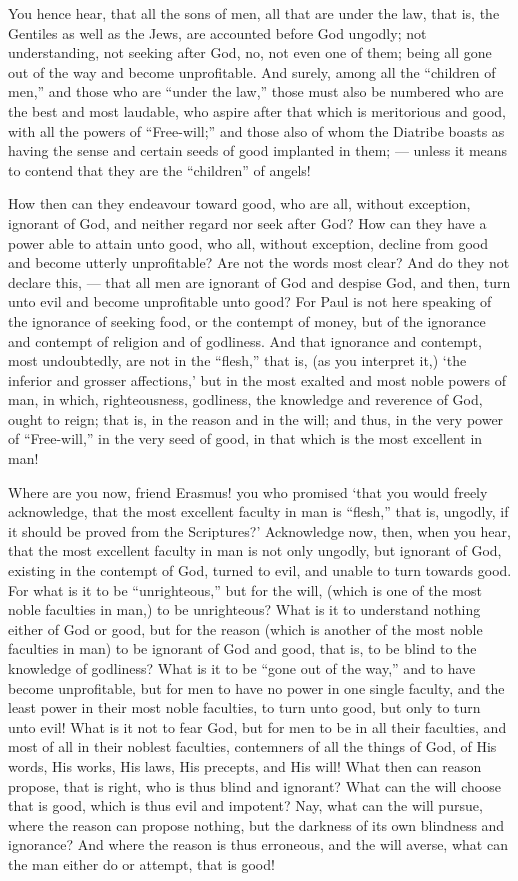 You hence hear, that all the sons of men, all that are under the law, that is, the Gentiles as well as the Jews, are accounted before God ungodly; not understanding, not seeking after God, no, not even one of them; being all gone out of the way and become unprofitable. And surely, among all the “children of men,” and those who are “under the law,” those must also be numbered who are the best and most laudable, who aspire after that which is meritorious and good, with all the powers of “Free-will;” and those also of whom the Diatribe boasts as having the sense and certain seeds of good implanted in them; — unless it means to contend that they are the “children” of angels!

How then can they endeavour toward good, who are all, without exception, ignorant of God, and neither regard nor seek after God? How can they have a power able to attain unto good, who all, without exception, decline from good and become utterly unprofitable? Are not the words most clear? And do they not declare this, — that all men are ignorant of God and despise God, and then, turn unto evil and become unprofitable unto good? For Paul is not here speaking of the ignorance of seeking food, or the contempt of money, but of the ignorance and contempt of religion and of godliness. And that ignorance and contempt, most undoubtedly, are not in the “flesh,” that is, (as you interpret it,) ‘the inferior and grosser affections,’ but in the most exalted and most noble powers of man, in which, righteousness, godliness, the knowledge and reverence of God, ought to reign; that is, in the reason and in the will; and thus, in the very power of “Free-will,” in the very seed of good, in that which is the most excellent in man!

Where are you now, friend Erasmus! you who promised ‘that you would freely acknowledge, that the most excellent faculty in man is “flesh,” that is, ungodly, if it should be proved from the Scriptures?’ Acknowledge now, then, when you hear, that the most excellent faculty in man is not only ungodly, but ignorant of God, existing in the contempt of God, turned to evil, and unable to turn towards good. For what is it to be “unrighteous,” but for the will, (which is one of the most noble faculties in man,) to be unrighteous? What is it to understand nothing either of God or good, but for the reason (which is another of the most noble faculties in man) to be ignorant of God and good, that is, to be blind to the knowledge of godliness? What is it to be “gone out of the way,” and to have become unprofitable, but for men to have no power in one single faculty, and the least power in their most noble faculties, to turn unto good, but only to turn unto evil! What is it not to fear God, but for men to be in all their faculties, and most of all in their noblest faculties, contemners of all the things of God, of His words, His works, His laws, His precepts, and His will! What then can reason propose, that is right, who is thus blind and ignorant? What can the will choose that is good, which is thus evil and impotent? Nay, what can the will pursue, where the reason can propose nothing, but the darkness of its own blindness and ignorance? And where the reason is thus erroneous, and the will averse, what can the man either do or attempt, that is good!

